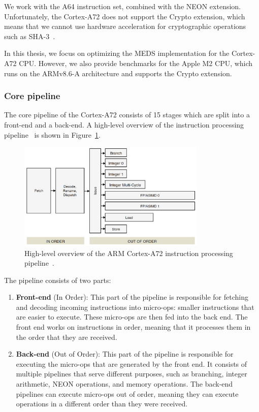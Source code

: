 \documentclass[11pt,a4paper]{report}
\theoremstyle{definition}
\begin{document}
We work with the A64 instruction set, combined with the NEON extension. Unfortunately, the Cortex-A72 does not support the Crypto extension, which means that we cannot use hardware acceleration for cryptographic operations such as SHA-3~\cite{dworkin2015sha}.

In this thesis, we focus on optimizing the MEDS implementation for the Cortex-A72 CPU. However, we also provide benchmarks for the Apple M2 CPU, which runs on the ARMv8.6-A architecture and supports the Crypto extension.

\subsubsection{Core pipeline}
The core pipeline of the Cortex-A72 consists of 15 stages which are split into a front-end and a back-end. A high-level overview of the instruction processing pipeline~\cite{CortexA72OptGuide} is shown in Figure~\ref{fig:cortexa72pipeline}.

\begin{figure}
  \centering
  \includegraphics[width=0.8\textwidth]{armv8/Cortex-A72-pipeline-simplified.jpg}
  \caption{High-level overview of the ARM Cortex-A72 instruction processing pipeline~\cite{CortexA72OptGuide}.}
  \label{fig:cortexa72pipeline}
\end{figure}

The pipeline consists of two parts:
\begin{enumerate}
  \item \textbf{Front-end} (In Order): This part of the pipeline is responsible for fetching and decoding incoming instructions into micro-ops: smaller instructions that are easier to execute. These micro-ops are then fed into the back end. The front end works on instructions in order, meaning that it processes them in the order that they are received.
  \item \textbf{Back-end} (Out of Order): This part of the pipeline is responsible for executing the micro-ops that are generated by the front end. It consists of multiple pipelines that serve different purposes, such as branching, integer arithmetic, NEON operations, and memory operations. The back-end pipelines can execute micro-ops out of order, meaning they can execute operations in a different order than they were received.
\end{enumerate}
\end{document}
